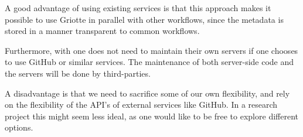 \documentclass[conference,a4paper]{IEEEtran}
\begin{document}
A good advantage of using existing services is that this approach
makes it possible to use Griotte in parallel with other workflows,
since the metadata is stored in a manner transparent to common
workflows.

Furthermore, with one does not need to maintain their own servers if
one chooses to use GitHub or similar services. The maintenance of both
server-side code and the servers will be done by third-parties.

A disadvantage is that we need to sacrifice some of our own
flexibility, and rely on the flexibility of the API's of external
services like GitHub. In a research project this might seem less
ideal, as one would like to be free to explore different
options.

\end{document}
